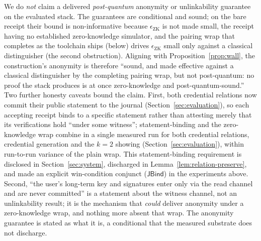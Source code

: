 We do \emph{not} claim a delivered \emph{post-quantum} anonymity or unlinkability guarantee on the evaluated stack. The guarantees are conditional and sound; on the bare receipt their bound is non-informative because $\epsilon_{\mathrm{ZK}}$ is not made small, the receipt having no established zero-knowledge simulator, and the pairing wrap that completes as the toolchain ships (below) drives $\epsilon_{\mathrm{ZK}}$ small only against a classical distinguisher (the second obstruction). Aligning with Proposition~\ref{prop:wall}, the construction's anonymity is therefore ``sound, and made effective against a classical distinguisher by the completing pairing wrap, but not post-quantum: no proof the stack produces is at once zero-knowledge and post-quantum-sound.'' Two further honesty caveats bound the claim. First, both credential relations now commit their public statement to the journal (Section~\ref{sec:evaluation}), so each accepting receipt binds to a specific statement rather than attesting merely that its verifications hold ``under some witness''; statement-binding and the zero-knowledge wrap combine in a single measured run for both credential relations, credential generation and the $k=2$ showing (Section~\ref{sec:evaluation}), within run-to-run variance of the plain wrap. This statement-binding requirement is disclosed in Section~\ref{sec:system}, discharged in Lemma~\ref{lem:relation-preserve}, and made an explicit win-condition conjunct ($\mathsf{JBind}$) in the experiments above. Second, ``the user's long-term key and signatures enter only via the read channel and are never committed'' is a statement about the witness channel, not an unlinkability result; it is the mechanism that \emph{could} deliver anonymity under a zero-knowledge wrap, and nothing more absent that wrap. The anonymity guarantee is stated as what it is, a conditional that the measured substrate does not discharge.

